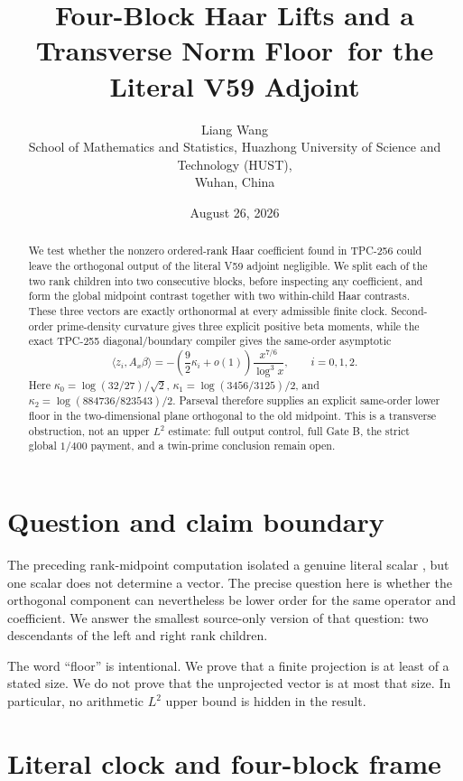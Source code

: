 \documentclass[10pt]{article}
\title{Four-Block Haar Lifts and a Transverse Norm Floor\
for the Literal V59 Adjoint}
\author{Liang Wang\\
\small School of Mathematics and Statistics, Huazhong University of Science and Technology (HUST),\\
\small Wuhan, China}
\date{August 26, 2026}
\newcommand{\ip}[2]{\langle #1,#2\rangle}
\begin{document}
\maketitle

\begin{abstract}
We test whether the nonzero ordered-rank Haar coefficient found in TPC-256
could leave the orthogonal output of the literal V59 adjoint negligible.  We
split each of the two rank children into two consecutive blocks, before
inspecting any coefficient, and form the global midpoint contrast together
with two within-child Haar contrasts.  These three vectors are exactly
orthonormal at every admissible finite clock.  Second-order prime-density
curvature gives three explicit positive beta moments, while the exact
TPC-255 diagonal/boundary compiler gives the same-order asymptotic
\[
 \ip{z_i}{A_x\beta}
 =-\left(\frac92\kappa_i+o(1)\right)
   \frac{x^{7/6}}{\log^3 x}, \qquad i=0,1,2.
\]
Here \(\kappa_0=\log(32/27)/\sqrt2\),
\(\kappa_1=\log(3456/3125)/2\), and
\(\kappa_2=\log(884736/823543)/2\).  Parseval therefore supplies an
explicit same-order lower floor in the two-dimensional plane orthogonal to
the old midpoint.  This is a transverse obstruction, not an upper \(L^2\)
estimate: full output control, full Gate B, the strict global \(1/400\)
payment, and a twin-prime conclusion remain open.
\end{abstract}

\section{Question and claim boundary}

The preceding rank-midpoint computation isolated a genuine literal scalar
\cite{tpc256},
but one scalar does not determine a vector.  The precise question here is
whether the orthogonal component can nevertheless be lower order for the same
operator and coefficient.  We answer the smallest source-only version of
that question: two descendants of the left and right rank children.

The word ``floor'' is intentional.  We prove that a finite projection is at
least of a stated size.  We do not prove that the unprojected vector is at
most that size.  In particular, no arithmetic \(L^2\) upper bound is hidden
in the result.

\section{Literal clock and four-block frame}
\end{document}
